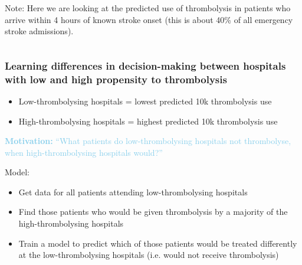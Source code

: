 \documentclass[xcolor={usenames,dvipsnames}]{beamer}
\begin{document}
\begin{frame}
\begin{columns}
    {\tiny
    Note: Here we are looking at the predicted use of thrombolysis in patients who arrive within 4 hours of
    known stroke onset (this is about 40\% of all emergency stroke admissions).}
\end{columns}

\end{frame}




\begin{frame}
\frametitle{Learning differences in decision-making between hospitals with low and high propensity to thrombolysis}

\vspace{-0.5em}

\begin{itemize}
  \footnotesize
  \item Low-thrombolysing hospitals = lowest predicted 10k thrombolysis use
  \item High-thrombolysing hospitals = highest predicted 10k thrombolysis use
\end{itemize} 

\vspace{1.5em}

\textcolor{SkyBlue}{\textbf{Motivation:} ``What patients do low-thrombolysing hospitals not thrombolyse, when high-thrombolysing hospitals would?''} 

\vspace{1.5em}

Model:
\begin{itemize}
  \footnotesize
  \item Get data for all patients attending low-thrombolysing hospitals
  \item Find those patients who would be given thrombolysis by a majority of the high-thrombolysing hospitals
  \item Train a model to predict which of those patients would be treated differently at the low-thrombolysing hospitals (i.e. would not receive thrombolysis)
\end{itemize}

\end{frame}


\end{document}
